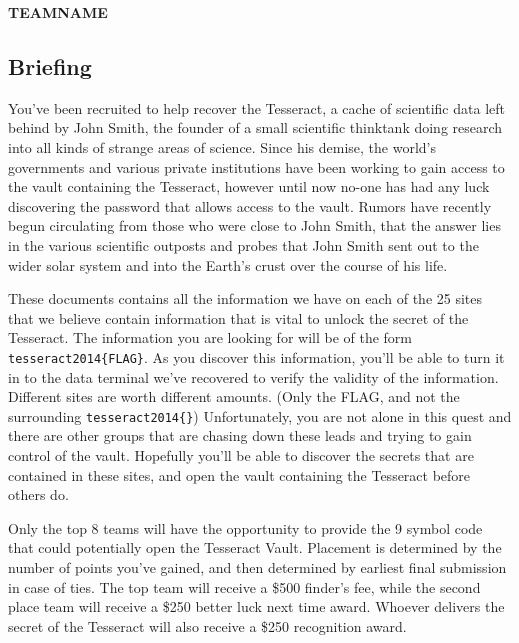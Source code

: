 \documentclass[10pt]{article}
\begin{document}
\begin{landscape}
\thispagestyle{empty}
\vspace*{\fill}
\begingroup
\centering
\begin{center}
{\bf\Huge TEAMNAME}
\end{center}
\endgroup
\vspace*{\fill}
\end{landscape}
\newpage
\begin{center}
\section*{Briefing}
\end{center}
You've been recruited to help recover the Tesseract, a cache of scientific data
left behind by John Smith, the founder of a small scientific thinktank doing
research into all kinds of strange areas of science. Since his demise, the
world's governments and various private institutions have been working to gain
access to the vault containing the Tesseract, however until now no-one has had
any luck discovering the password that allows access to the vault. Rumors have
recently begun circulating from those who were close to John Smith, that the
answer lies in the various scientific outposts and probes that John Smith sent
out to the wider solar system and into the Earth's crust over the course of his
life.

These documents contains all the information we have on each of the 25 sites
that we believe contain information that is vital to unlock the secret of the
Tesseract. The information you are looking for will be of the form
{\tt tesseract2014\{FLAG\}}. As you discover this information, you'll be able to
turn it in to the data terminal we've recovered to verify the validity of the
information. Different sites are worth different amounts. (Only the FLAG, and
not the surrounding {\tt tesseract2014\{\}}) Unfortunately, you are not alone in
this quest and there are other groups that are chasing down these leads and
trying to gain control of the vault. Hopefully you'll be able to discover the
secrets that are contained in these sites, and open the vault containing the
Tesseract before others do.

Only the top 8 teams will have the opportunity to provide the 9 symbol code that
could potentially open the Tesseract Vault. Placement is determined by the
number of points you've gained, and then determined by earliest final submission
in case of ties. The top team will receive a \$500 finder's fee, while the
second place team will receive a \$250 better luck next time award. Whoever
delivers the secret of the Tesseract will also receive a \$250 recognition
award.
\end{document}
